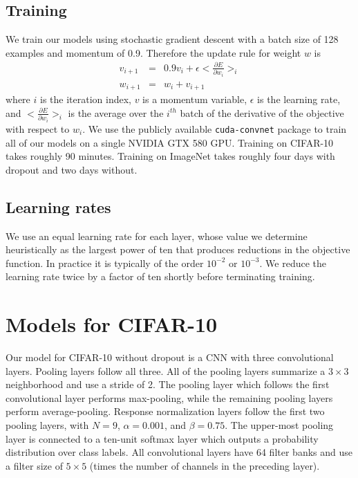 \documentclass[12pt]{article}
\begin{document}
\subsection{Training}

We train our models using stochastic gradient descent with a batch
size of 128 examples and momentum of 0.9. Therefore the update rule
for weight $w$ is
\begin{eqnarray*}
v_{i+1} & = & 0.9 v_{i}+\epsilon<\frac{\partial E}{\partial w_{i}}>_{i}\\
w_{i+1} & = & w_{i}+v_{i+1}
\end{eqnarray*}
where $i$ is the iteration index, $v$ is a momentum variable, $\epsilon$
is the learning rate, and $<\frac{\partial E}{\partial w_{i}}>_{i}$
is the average over the $i^{th}$ batch of the derivative of the objective
with respect to $w_{i}$. We use the publicly available \texttt{cuda-convnet}
package to train all of our models on a single NVIDIA GTX 580 GPU.
Training on CIFAR-10 takes roughly 90 minutes. Training on ImageNet
takes roughly four days with dropout and two days without.


\subsection{Learning rates}

We use an equal learning rate for each layer, whose value we determine
heuristically as the largest power of ten that produces reductions
in the objective function. In practice it is typically of the order
$10^{-2}$ or $10^{-3}$. We reduce the learning rate twice by a
factor of ten shortly before terminating training.


\section{Models for CIFAR-10}

Our model for CIFAR-10 without dropout is a CNN with three convolutional
layers. Pooling layers follow all three. All of the pooling layers
summarize a $3\times3$ neighborhood and use a stride of 2. The pooling
layer which follows the first convolutional layer performs max-pooling,
while the remaining pooling layers perform average-pooling. Response
normalization layers follow the first two pooling layers, with $N=9$,
$\alpha=0.001$, and $\beta=0.75$. The upper-most pooling layer is
connected to a ten-unit softmax layer which outputs a probability
distribution over class labels. All convolutional layers have 64 filter banks
and use a filter size of $5\times5$ (times the number of channels
in the preceding layer).
\end{document}

